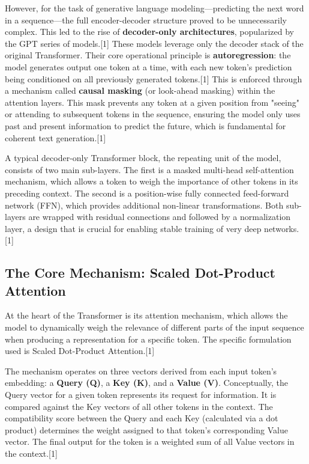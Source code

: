 \documentclass[12pt, a4paper]{article}
\begin{document}
However, for the task of generative language modeling—predicting the next word in a sequence—the full encoder-decoder structure proved to be unnecessarily complex. This led to the rise of \textbf{decoder-only architectures}, popularized by the GPT series of models.[1] These models leverage only the decoder stack of the original Transformer. Their core operational principle is \textbf{autoregression}: the model generates output one token at a time, with each new token's prediction being conditioned on all previously generated tokens.[1] This is enforced through a mechanism called \textbf{causal masking} (or look-ahead masking) within the attention layers. This mask prevents any token at a given position from "seeing" or attending to subsequent tokens in the sequence, ensuring the model only uses past and present information to predict the future, which is fundamental for coherent text generation.[1]

A typical decoder-only Transformer block, the repeating unit of the model, consists of two main sub-layers. The first is a masked multi-head self-attention mechanism, which allows a token to weigh the importance of other tokens in its preceding context. The second is a position-wise fully connected feed-forward network (FFN), which provides additional non-linear transformations. Both sub-layers are wrapped with residual connections and followed by a normalization layer, a design that is crucial for enabling stable training of very deep networks.[1]

\subsection{The Core Mechanism: Scaled Dot-Product Attention}

At the heart of the Transformer is its attention mechanism, which allows the model to dynamically weigh the relevance of different parts of the input sequence when producing a representation for a specific token. The specific formulation used is Scaled Dot-Product Attention.[1]

The mechanism operates on three vectors derived from each input token's embedding: a \textbf{Query (Q)}, a \textbf{Key (K)}, and a \textbf{Value (V)}. Conceptually, the Query vector for a given token represents its request for information. It is compared against the Key vectors of all other tokens in the context. The compatibility score between the Query and each Key (calculated via a dot product) determines the weight assigned to that token's corresponding Value vector. The final output for the token is a weighted sum of all Value vectors in the context.[1]
\end{document}
